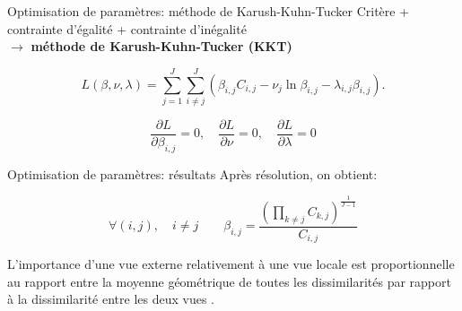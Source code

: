 \documentclass[hyperref={pdfpagelabels=false}]{beamer}
\begin{document}
    \begin{frame}{Optimisation de paramètres: méthode de Karush-Kuhn-Tucker}
        Critère + contrainte d'égalité + contrainte d'inégalité\\
        $\rightarrow$ \textbf{méthode de Karush-Kuhn-Tucker (KKT)} 

        \begin{equation*}
        L(\beta,\nu,\lambda)=\sum_{j=1}^J  \sum_{i \neq j}^J ( \beta_{i,j}  C_{i,j}
        - \nu_j  \ln  \beta_{i,j}  - \lambda_{i,j}   \beta_{i,j} ).
        \end{equation*}

        \begin{equation*}
            \frac{\partial L}{\partial \beta_{i,j}} = 0,
            \quad
            \frac{\partial L}{\partial \nu} = 0,
            \quad
            \frac{\partial L}{\partial \lambda} = 0
        \end{equation*}
    \end{frame}
    
    \begin{frame}{Optimisation de paramètres: résultats}
        Après résolution, on obtient:

        \vspace{0.6cm}

        \begin{equation*}
            \forall (i,j), \quad i\neq j \qquad \beta_{i,j} =  
            \frac{(\prod_{k\neq j} C _{k,j})^{\frac 
            1 {J-1}}}{C_{i,j}}
        \end{equation*} 

        \vspace{1cm}
        L'importance d'une vue externe relativement à une vue locale est
        proportionnelle au rapport entre la moyenne géométrique de toutes les
        dissimilarités par rapport à la dissimilarité entre les deux vues
        .\\
    \end{frame}
\end{document}
